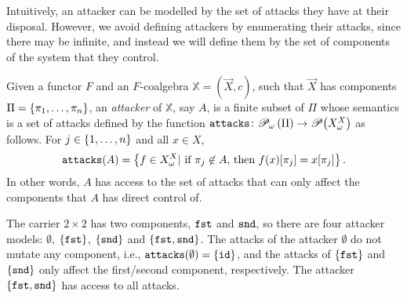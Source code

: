 Intuitively, an attacker can be modelled by the set of attacks they have at their disposal. However, we avoid defining attackers by enumerating their attacks, since there may be infinite, and instead we will define them by the set of components of the system that they control. 
    \begin{definition}[Attacker]
    Given a functor $F$ and an $F$-coalgebra $\mathbb{X}=(\vec{X},c)$, such that $\vec{X}$ has components $\Pi=\left\{\pi_1, \ldots, \pi_n\right\}$, an \emph{attacker} of $\mathbb{X}$, say $A$, is a {finite} subset of $\Pi$ whose semantics is a set of attacks defined by the function $\texttt{attacks}\colon {{{\mathscr{P}}_\omega}\left(\Pi\right)}\rightarrow{{\mathscr{P}}\!\left({X^X_\omega}\right)}$ as follows. 
    For $j\in \left\{1, \ldots,  n\right\}$ and all $x\in X$,
    \begin{align}
    \texttt{attacks}(A)=\left\{f\in X^X_\omega | \text{ if $\pi_j \not\in A$, then $f(x)[\pi_j]=x[\pi_j]$}\right\}.
    \end{align}
    In other words, $A$ has access to the set of attacks that can only affect the components that $A$ has direct control of.
     \end{definition}
 \begin{example}
 The carrier $2\times 2$ has two components, $\mathtt{\texttt{fst}}$ and $\mathtt{\texttt{snd}}$, so there are four attacker models: $\emptyset$, $\left\{\mathtt{\texttt{fst}}\right\}$, $\left\{\mathtt{\texttt{snd}}\right\}$ and $\left\{\mathtt{\texttt{fst}},\mathtt{\texttt{snd}}\right\}$. The attacks of the attacker $\emptyset$ do not mutate any component, i.e., $\texttt{attacks}(\emptyset)=\left\{{\texttt{id}}\right\}$, and the attacks of $\left\{\mathtt{\texttt{fst}}\right\}$ and $\left\{\mathtt{\texttt{snd}}\right\}$ only affect the first/second component, respectively. The attacker $\left\{\mathtt{\texttt{fst}},\mathtt{\texttt{snd}}\right\}$ has access to all attacks.
 \end{example}

